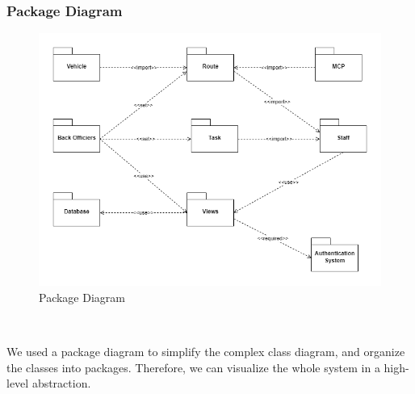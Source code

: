 \documentclass[a4paper, 13pt]{article}
\begin{document}
\subsubsection*{Package Diagram}
\begin{figure}[H]
        \centering
        \includegraphics[scale=0.5]{architecture-design/diagramPackage.png}
        \caption{Package Diagram}
        \label{fig:my_label}
    \end{figure}\\
    \begin{tcolorbox}[colback=blue!5!white,colframe=blue!75!black]
We used a package diagram to simplify the complex class diagram, and organize the classes into packages. Therefore, we can visualize the whole system in a high-level abstraction. 
\end{tcolorbox}
\end{document}
